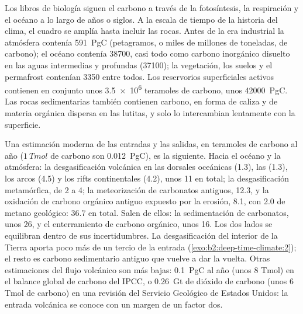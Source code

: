 Los libros de biología siguen el carbono a través de la fotosíntesis, la respiración y el océano a lo largo de años o
siglos. A la escala de tiempo de la historia del clima, el cuadro se amplía hasta incluir las rocas. Antes de
la era industrial la atmósfera contenía \qty{591}{PgC} (petagramos, o miles de millones de toneladas, de carbono);
el océano contenía \num{38700}, casi todo como carbono inorgánico disuelto en las aguas intermedias y
profundas (\num{37100}); la vegetación, los suelos y el permafrost contenían \num{3350} entre todos. Los
reservorios superficiales activos contienen en conjunto unos \num{3.5e6} teramoles de carbono, unos
\qty{42000}{PgC}. Las rocas sedimentarias también contienen carbono, en forma de caliza y de materia orgánica
dispersa en las lutitas, y solo lo intercambian lentamente con la superficie.

Una estimación moderna de las entradas y las salidas, en teramoles de carbono al año ($\qty{1}{Tmol}$ de
carbono son \qty{0.012}{PgC}), es la siguiente. Hacia el océano y la atmósfera: la desgasificación volcánica en las
dorsales oceánicas (1.3), las  (1.3), los arcos (4.5) y los rifts continentales (4.2), unos 11 en
total; la desgasificación metamórfica, de 2 a 4; la meteorización de carbonatos antiguos, 12.3, y la oxidación de
carbono orgánico antiguo expuesto por la erosión, 8.1, con 2.0 de metano geológico: \num{36.7} en total.
Salen de ellos: la sedimentación de carbonatos, unos 26, y el enterramiento de carbono orgánico, unos 16. Los dos
lados se equilibran dentro de sus incertidumbres. La desgasificación del interior de la Tierra aporta poco más de un
tercio de la entrada (\cref{exo:b2:deep-time-climate:2}); el resto es carbono sedimentario antiguo que
vuelve a dar la vuelta. Otras estimaciones del flujo volcánico son más bajas: \qty{0.1}{PgC} al año
(unos 8 Tmol) en el balance global de carbono del IPCC, o \qty{0.26}{Gt} de dióxido de carbono (unos 6
Tmol de carbono) en una revisión del Servicio Geológico de Estados Unidos: la entrada volcánica se conoce con un
margen de un factor dos.

